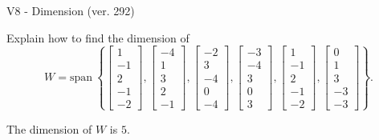 \begin{exercise}
  \begin{exerciseTitle}V8 - Dimension (ver. 292)\end{exerciseTitle}
  \begin{exerciseStatement}
    Explain how to find the dimension of 
\[W=\mathrm{span}\ \left\{\left[\begin{array}{r}
1 \\
-1 \\
2 \\
-1 \\
-2
\end{array}\right] , \left[\begin{array}{r}
-4 \\
1 \\
3 \\
2 \\
-1
\end{array}\right] , \left[\begin{array}{r}
-2 \\
3 \\
-4 \\
0 \\
-4
\end{array}\right] , \left[\begin{array}{r}
-3 \\
-4 \\
3 \\
0 \\
3
\end{array}\right] , \left[\begin{array}{r}
1 \\
-1 \\
2 \\
-1 \\
-2
\end{array}\right] , \left[\begin{array}{r}
0 \\
1 \\
3 \\
-3 \\
-3
\end{array}\right]\right\}.\]



  \end{exerciseStatement}
  \begin{exerciseAnswer}
   The dimension of \(W\) is  \(5\).
  


  \end{exerciseAnswer}
\end{exercise}